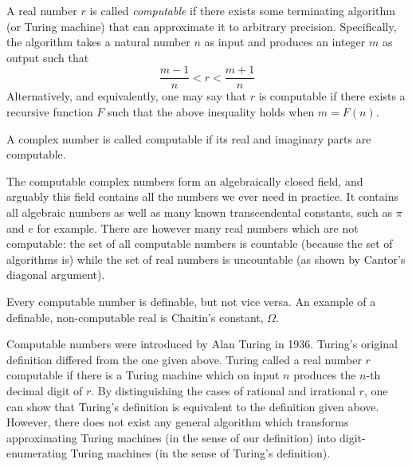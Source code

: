 \documentclass[12pt]{article}
\begin{document}

A real number $r$ is called \emph{computable} if there exists some terminating algorithm (or Turing machine) that can approximate it to arbitrary precision. Specifically, the algorithm takes a natural number $n$ as input and produces an integer $m$ as output such that
\[\frac{m-1}{n} < r < \frac{m+1}{n}\]
Alternatively, and equivalently, one may say that $r$ is computable if there exists a recursive function $F$ such that the above inequality holds when $m = F(n)$. 

A complex number is called computable if its real and imaginary parts are computable.

The computable complex numbers form an algebraically closed field, and arguably this field contains all the numbers we ever need in practice. It contains all algebraic numbers as well as many known transcendental constants, such as $\pi$ and $e$ for example. There are however many real numbers which are not computable: the set of all computable numbers is countable (because the set of algorithms is) while the set of real numbers is uncountable (as shown by Cantor's diagonal argument).

Every computable number is definable, but not vice versa. An example of a definable, non-computable real is Chaitin's constant, $\Omega$.

Computable numbers were introduced by Alan Turing in 1936. Turing's original definition differed from the one given above. Turing called a real number $r$ computable if there is a Turing machine which on input $n$ produces the $n$-th decimal digit of $r$. By distinguishing the cases of rational and irrational $r$, one can show that Turing's definition is equivalent to the definition given above. However, there does not exist any general algorithm which transforms approximating Turing machines (in the sense of our definition) into digit-enumerating Turing machines (in the sense of Turing's definition).
\end{document}
